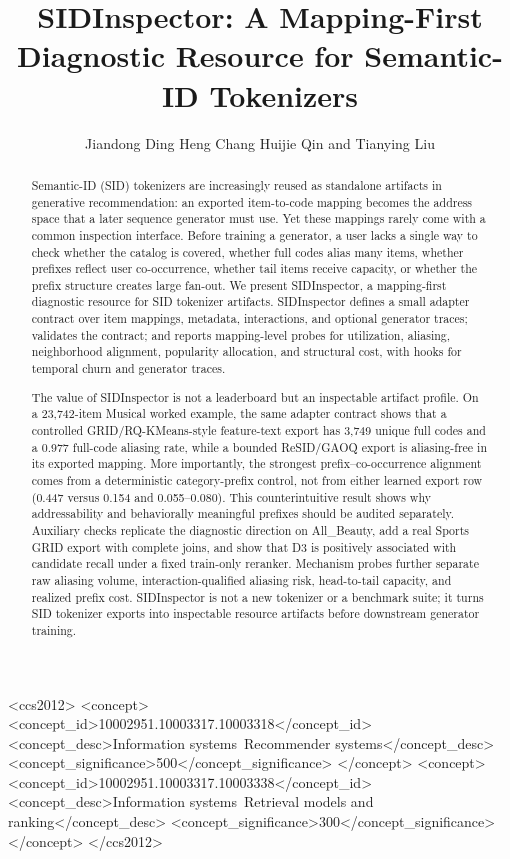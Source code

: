 \documentclass[sigconf,natbib=true]{acmart}
\title{SIDInspector: A Mapping-First Diagnostic Resource for Semantic-ID Tokenizers}
\author{Jiandong Ding\emailcomma{} Heng Chang\emailcomma{} Huijie Qin\emailcomma{} and Tianying Liu}
\affiliation{%
  \institution{Huawei Technologies}
  \city{Shanghai}
  \country{China}
}
\newcommand{\tool}{SIDInspector\xspace}
\newcommand{\sid}{SID\xspace}
\begin{document}
\begin{CCSXML}
<ccs2012>
 <concept>
  <concept_id>10002951.10003317.10003318</concept_id>
  <concept_desc>Information systems~Recommender systems</concept_desc>
  <concept_significance>500</concept_significance>
 </concept>
 <concept>
  <concept_id>10002951.10003317.10003338</concept_id>
  <concept_desc>Information systems~Retrieval models and ranking</concept_desc>
  <concept_significance>300</concept_significance>
 </concept>
</ccs2012>
\end{CCSXML}


\begin{abstract}
Semantic-ID (\sid) tokenizers are increasingly reused as standalone artifacts
in generative recommendation: an exported item-to-code mapping becomes the
address space that a later sequence generator must use. Yet these mappings
rarely come with a common inspection interface. Before training a generator, a
user lacks a single way to check whether the catalog is covered, whether full
codes alias many items, whether prefixes reflect user
co-occurrence, whether tail items receive capacity, or whether the prefix
structure creates large fan-out. We present \tool, a mapping-first diagnostic
resource for \sid tokenizer artifacts. \tool defines a small adapter contract
over item mappings, metadata, interactions, and optional generator traces;
validates the contract; and reports mapping-level probes for utilization,
aliasing, neighborhood alignment, popularity allocation, and structural cost,
with hooks for temporal churn and generator traces.

The value of \tool is not a leaderboard but an inspectable artifact profile.
On a 23,742-item Musical worked example, the same adapter contract
shows that a controlled GRID/RQ-KMeans-style feature-text export has 3,749
unique full codes and a 0.977 full-code aliasing rate, while a bounded
ReSID/GAOQ export is aliasing-free in its exported mapping. More importantly,
the strongest prefix--co-occurrence alignment comes
from a deterministic category-prefix control, not from either learned export
row (0.447 versus 0.154 and 0.055--0.080). This counterintuitive result
shows why addressability and behaviorally meaningful prefixes should be audited
separately. Auxiliary checks replicate the diagnostic direction on All\_Beauty,
add a real Sports GRID export with complete joins, and show that D3 is
positively associated with candidate recall under a fixed train-only reranker.
Mechanism probes further separate raw aliasing volume, interaction-qualified
aliasing risk, head-to-tail capacity, and realized prefix cost. \tool is not a
new tokenizer or a benchmark suite; it turns \sid tokenizer exports into
inspectable resource artifacts before downstream generator training.
\end{abstract}
\end{document}
